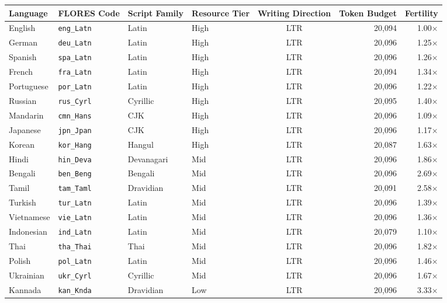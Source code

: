 \documentclass[11pt]{article}
\begin{document}
\begin{table}[t]
\centering
\scriptsize
\setlength{\tabcolsep}{3pt}
\renewcommand{\arraystretch}{0.82}
\begin{tabularx}{\textwidth}{llllcrr}
\toprule
\textbf{Language} & \textbf{FLORES Code} & \textbf{Script Family} & \textbf{Resource Tier} & \textbf{Writing Direction} & \textbf{Token Budget} & \textbf{Fertility} \\
\midrule
English & \texttt{eng\_Latn} & Latin & High & LTR & 20,094 & 1.00$\times$ \\
German & \texttt{deu\_Latn} & Latin & High & LTR & 20,096 & 1.25$\times$ \\
Spanish & \texttt{spa\_Latn} & Latin & High & LTR & 20,096 & 1.26$\times$ \\
French & \texttt{fra\_Latn} & Latin & High & LTR & 20,094 & 1.34$\times$ \\
Portuguese & \texttt{por\_Latn} & Latin & High & LTR & 20,096 & 1.22$\times$ \\
Russian & \texttt{rus\_Cyrl} & Cyrillic & High & LTR & 20,095 & 1.40$\times$ \\
Mandarin & \texttt{cmn\_Hans} & CJK & High & LTR & 20,096 & 1.09$\times$ \\
Japanese & \texttt{jpn\_Jpan} & CJK & High & LTR & 20,096 & 1.17$\times$ \\
Korean & \texttt{kor\_Hang} & Hangul & High & LTR & 20,087 & 1.63$\times$ \\
\midrule
Hindi & \texttt{hin\_Deva} & Devanagari & Mid & LTR & 20,096 & 1.86$\times$ \\
Bengali & \texttt{ben\_Beng} & Bengali & Mid & LTR & 20,096 & 2.69$\times$ \\
Tamil & \texttt{tam\_Taml} & Dravidian & Mid & LTR & 20,091 & 2.58$\times$ \\
Turkish & \texttt{tur\_Latn} & Latin & Mid & LTR & 20,096 & 1.39$\times$ \\
Vietnamese & \texttt{vie\_Latn} & Latin & Mid & LTR & 20,096 & 1.36$\times$ \\
Indonesian & \texttt{ind\_Latn} & Latin & Mid & LTR & 20,079 & 1.10$\times$ \\
Thai & \texttt{tha\_Thai} & Thai & Mid & LTR & 20,096 & 1.82$\times$ \\
Polish & \texttt{pol\_Latn} & Latin & Mid & LTR & 20,096 & 1.46$\times$ \\
Ukrainian & \texttt{ukr\_Cyrl} & Cyrillic & Mid & LTR & 20,096 & 1.67$\times$ \\
\midrule
Kannada & \texttt{kan\_Knda} & Dravidian & Low & LTR & 20,096 & 3.33$\times$ \\

\end{tabularx}
\end{table}
\end{document}
